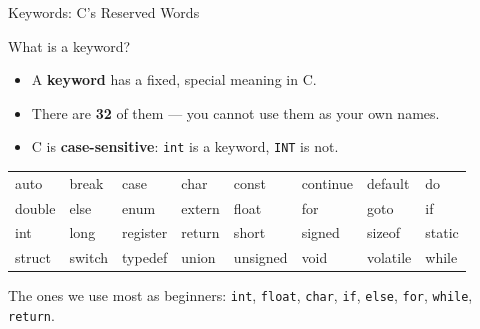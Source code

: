 \documentclass[aspectratio=169]{beamer}
\begin{document}
	\begin{frame}{Keywords: C's Reserved Words}
		\begin{block}{What is a keyword?}
			\begin{itemize}
				\item A \textbf{keyword} has a fixed, special meaning in C.
				\item There are \textbf{32} of them --- you
				cannot use them as your own names.
				\item C is \textbf{case-sensitive}: \texttt{int} is a keyword, \texttt{INT} is not.
			\end{itemize}

		\end{block}
		\vspace*{0.5cm}
		\renewcommand{\arraystretch}{1.3}
		\centering\ttfamily
		\begin{tabular}{@{}llllllll@{}}
			auto & break & case & char & const & continue & default & do \\
			double & else & enum & extern & float & for & goto & if \\
			int & long & register & return & short & signed & sizeof & static \\
			struct & switch & typedef & union & unsigned & void & volatile & while \\
		\end{tabular}
		
		\vspace{0.25cm}
		\normalfont The ones we use most as beginners: \texttt{int}, \texttt{float}, \texttt{char}, \texttt{if}, \texttt{else}, \texttt{for}, \texttt{while}, \texttt{return}.
	\end{frame}
	
\end{document}
